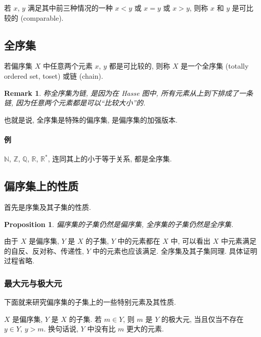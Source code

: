 \documentclass[UTF8]{ctexart}
\theoremstyle{mystyle}
\newtheorem{proposition}{Proposition}[section]
\theoremstyle{myremark}
\newtheorem*{remark}{Remark}
\theoremstyle{plain}
\newcommand{\R}{\mathbb R}
\newcommand{\Z}{\mathbb Z}
\newcommand{\N}{\mathbb N}
\newcommand{\Q}{\mathbb Q}
\begin{document}
若 $ x $, $ y $ 满足其中前三种情况的一种 $ x < y $ 或 $ x = y $ 或 $ x > y $, 则称 $ x $ 和 $ y $ 是可比较的 (comparable).

\subsection{全序集}
\begin{definition}
    若偏序集 $ X $ 中任意两个元素 $ x $, $ y $ 都是可比较的, 则称 $ X $ 是一个全序集 (totally ordered set, toset) 或链 (chain).
\end{definition}

\begin{remark}
    称全序集为链, 是因为在 Hasse 图中, 所有元素从上到下排成了一条链, 因为任意两个元素都是可以``比较大小''的.
\end{remark}

也就是说, 全序集是特殊的偏序集, 是偏序集的加强版本.

\paragraph{例}
$ \N $, $ \Z $, $ \Q $, $ \R $, $ \R^* $, 连同其上的小于等于关系, 都是全序集.


\subsection{偏序集上的性质}
首先是序集及其子集的性质.

\begin{proposition}
    偏序集的子集仍然是偏序集, 全序集的子集仍然是全序集.
\end{proposition}

由于 $ X $ 是偏序集, $ Y $ 是 $ X $ 的子集, $ Y $ 中的元素都在 $ X $ 中, 可以看出 $ X $ 中元素满足的自反、反对称、传递性, $ Y $ 中的元素也应该满足. 全序集及其子集同理. 具体证明过程省略.

\subsubsection{最大元与极大元}
下面就来研究偏序集的子集上的一些特别元素及其性质.

\begin{definition}
    $ X $ 是偏序集, $ Y $ 是 $ X $ 的子集. 若 $ m \in Y $, 则 $ m $ 是 $ Y $ 的极大元, 当且仅当不存在 $ y \in Y $, $ y > m $. 换句话说, $ Y $ 中没有比 $ m $ 更大的元素. 
\end{definition}
\end{document}
